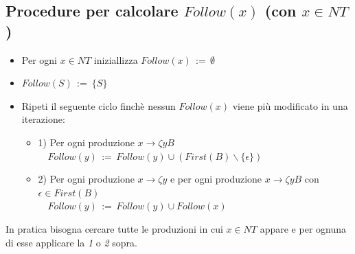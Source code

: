 \documentclass[a4paper,12pt]{article}
\begin{document}
{\subsection*{Procedure per calcolare $Follow(x)$ (con $x \in NT$)}
\begin{itemize}
  \item Per ogni $x \in NT$ iniziallizza $Follow(x) \, := \, \emptyset$
  \item $Follow(S) \, := \ \{S\}$
  \item Ripeti il seguente ciclo finchè nessun $Follow(x)$ viene più modificato in una iterazione:
  \begin{itemize}
    \item 1) Per ogni produzione $x \to \zeta yB$ \\
    $\quad Follow(y) \, := \, Follow(y) \cup (First(B) \backslash \{\epsilon\})$
    \item 2) Per ogni produzione $x \to \zeta y$ e per ogni produzione $x \to \zeta yB$ con $\epsilon \in First(B)$ \\
    $\quad Follow(y)\, := \, Follow(y) \cup Follow(x)$
  \end{itemize}
\end{itemize}
In pratica bisogna cercare tutte le produzioni in cui $x \in NT$ appare e per ognuna di esse applicare la \textit{1} o \textit{2} sopra. \\
\vspace{1em} \\
}
\end{document}
